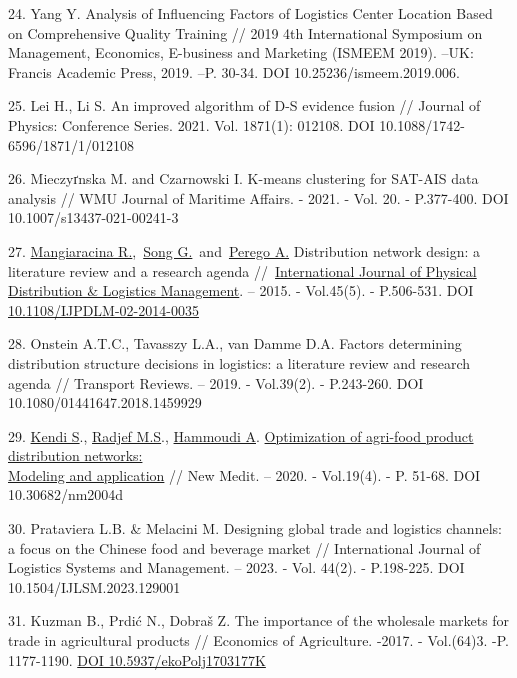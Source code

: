 \begin{references}
24. Yang Y. Analysis of Influencing Factors of Logistics Center Location
Based on Comprehensive Quality Training // 2019 4th International
Symposium on Management, Economics, E-business and Marketing (ISMEEM
2019). --UK: Francis Academic Press, 2019. --P. 30-34. DOI
10.25236/ismeem.2019.006.

25. Lei H., Li S. An improved algorithm of D-S evidence fusion // Journal
of Physics: Conference Series. 2021. Vol. 1871(1): 012108. DOI
10.1088/1742-6596/1871/1/012108

26. Mieczyґnska M. and Czarnowski I. K-means clustering for SAT-AIS data
analysis // WMU Journal of Maritime Affairs. - 2021. - Vol. 20. -
P.377-400. DOI 10.1007/s13437-021-00241-3

27. \href{https://www.emerald.com/insight/search?q=Riccardo\%20Mangiaracina}{Mangiaracina
R.},~\href{https://www.emerald.com/insight/search?q=Guang\%20Song}{Song
G.}~and~\href{https://www.emerald.com/insight/search?q=Alessandro\%20Perego}{Perego
A.} Distribution network design: a literature review and a research
agenda
//~\href{https://www.emerald.com/insight/publication/issn/0960-0035}{International
Journal of Physical Distribution \& Logistics Management}. -- 2015. -
Vol.45(5). - P.506-531. DOI
\href{http://dx.doi.org/10.1108/IJPDLM-02-2014-0035}{10.1108/IJPDLM-02-2014-0035}

28. Onstein A.T.C., Tavasszy L.A., van Damme D.A. Factors determining
distribution structure decisions in logistics: a literature review and
research agenda // Transport Reviews. -- 2019. - Vol.39(2). -
P.243-260. DOI 10.1080/01441647.2018.1459929

29. \href{https://www.webofscience.com/wos/author/record/24657901}{Kendi
S}.,
\href{https://www.webofscience.com/wos/author/record/13850822}{Radjef
M.S}.,
\href{https://www.webofscience.com/wos/author/record/29644444}{Hammoudi
A}.
\href{https://www.webofscience.com/wos/woscc/full-record/WOS:000598477800004}{Optimization
of agri-food product distribution networks: \\Modeling and application}
// New Medit. -- 2020. - Vol.19(4). - P. 51-68. DOI 10.30682/nm2004d

30. Prataviera L.B. \& Melacini M. Designing global trade and logistics
channels: a focus on the Chinese food and beverage market //
International Journal of Logistics Systems and Management. -- 2023. -
Vol. 44(2). - P.198-225. DOI 10.1504/IJLSM.2023.129001

31. Kuzman B., Prdić N., Dobraš Z. The importance of the wholesale markets
for trade in agricultural products // Economics of Agriculture. -2017.
- Vol.(64)3. -P. 1177-1190.
\href{https://doi.org/10.5937/ekoPolj1703177K}{DOI
10.5937/ekoPolj1703177K}


\end{references}

